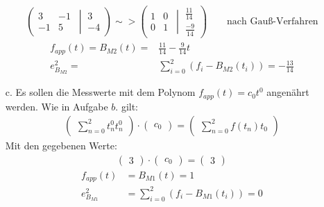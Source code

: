 \begin{itemize}
\begin{align*}
			\left(\left. \begin{matrix}
				3	&	-1 \\ -1 	& 5\end{matrix}\ \ \right|\ \begin{matrix} 3\\-4
			\end{matrix}\right)
			\sim>
			\left(\left. \begin{matrix}
				1	&	0 \\ 0 	& 1\end{matrix}\ \ \right|\ \begin{matrix} \frac{11}{14}\\\frac{-9}{14}
			\end{matrix}\right)\quad\quad\text{nach Gauß-Verfahren}
		\end{align*}
		\begin{align*}
			f_{app}(t) = B_{M2}(t)	=& \frac{11}{14}-\frac{9}{14}t\\
			e_{B_{M2}}^2			=& \sum_{i=0}^2\left( f_i - B_{M2}(t_i) \right) = -\frac{13}{14}
		\end{align*}
		\item[c.] Es sollen die Messwerte mit dem Polynom $f_{app}(t) = c_0t^0$ angenährt werden. Wie in Aufgabe $b.$ gilt:
		\begin{align*}
			\left(\begin{matrix} \sum_{n=0}^2 t_n^0t_n^0\end{matrix}\right) \cdot \left(\begin{matrix} c_0 \end{matrix}\right) = \left(\begin{matrix} \sum_{n=0}^2f(t_n)t_0\end{matrix}\right)
		\end{align*}
		Mit den gegebenen Werte:
		\begin{align*}
			\left(\begin{matrix} 3\end{matrix}\right) \cdot \left(\begin{matrix} c_0 \end{matrix}\right) = \left(\begin{matrix} 3\end{matrix}\right)
		\end{align*}
		\begin{align*}
			f_{app}(t)		&= B_{M1}(t) = 1\\
			e_{B_{M1}}^2	&= \sum_{i=0}^2\left( f_i - B_{M1}(t_i) \right) = 0
		\end{align*}

\end{itemize}
